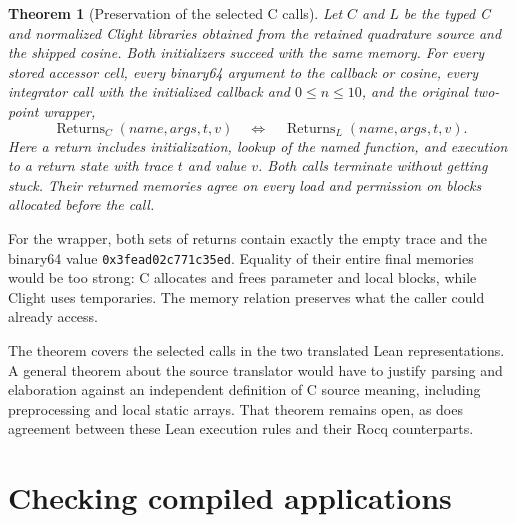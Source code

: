 \documentclass[11pt]{article}
\newtheorem{theorem}{Theorem}[section]
\newcommand{\code}[1]{%
  \ifmmode\text{\texttt{\detokenize{#1}}}\else\nolinkurl{#1}\fi}
\begin{document}
\begin{samepage}
\begin{theorem}[Preservation of the selected C calls]
\label{thm:c-preservation}
Let $C$ and $L$ be the typed C and normalized Clight libraries obtained from
the retained quadrature source and the shipped cosine. Both initializers
succeed with the same memory. For every stored accessor cell, every binary64
argument to the callback or cosine, every integrator call with the
initialized callback and $0\le n\le10$, and the original two-point wrapper,
\[
  \operatorname{Returns}_{C}(\mathit{name},\mathit{args},t,v)
  \quad\Longleftrightarrow\quad
  \operatorname{Returns}_{L}(\mathit{name},\mathit{args},t,v).
\]
Here a return includes initialization, lookup of the named function,
and execution to a return state with trace $t$ and value $v$.
Both calls terminate without getting stuck. Their returned memories agree
on every load and permission on blocks allocated before the call.
\end{theorem}
\end{samepage}

For the wrapper, both sets of returns contain exactly the empty trace and
the binary64 value \code{0x3fead02c771c35ed}. Equality of their entire final
memories would be too strong: C allocates and frees parameter and local
blocks, while Clight uses temporaries. The memory relation preserves what
the caller could already access.

The theorem covers the selected calls in the two translated Lean
representations. A general theorem about the source translator would have
to justify parsing and elaboration against an independent definition of C
source meaning, including preprocessing and local static arrays. That
theorem remains open, as does agreement between these Lean execution rules
and their Rocq counterparts.

\section{Checking compiled applications}
\label{sec:compilation}
\end{document}
